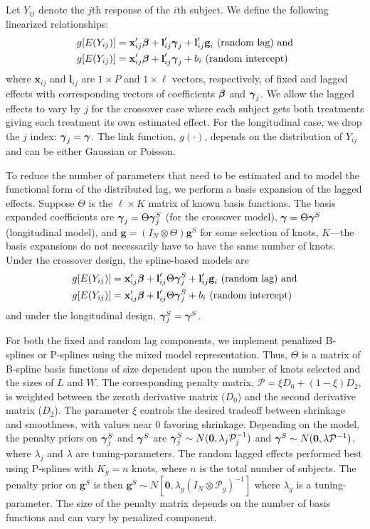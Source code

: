 \documentclass[10pt]{article}
\newcommand{\bbeta}{{\mbox{\boldmath$\beta$}}}
\newcommand{\bgamma}{{\mbox{\boldmath$\gamma$}}}
\newcommand{\bx}{\textbf{x}}
\newcommand{\bl}{\textbf{l}}
\newcommand{\bg}{\textbf{g}}
\begin{document}
Let $Y_{ij}$ denote the $j$th response of the $i$th subject. We define the following linearized relationships:
	\begin{align*}
		g[E(Y_{ij})] &= \bx_{ij}'\bbeta + \bl_{ij}'\bgamma_j +  \bl_{ij}'\bg_i \text{ (random lag) and}\\
		g[E(Y_{ij})] &= \bx_{ij}'\bbeta + \bl_{ij}'\bgamma_j + b_i\text{ (random intercept)}
	\end{align*}
	where $\bx_{ij}$ and $\bl_{ij}$ are $1\times P$ and $1\times\ell$ vectors, respectively, of fixed and lagged effects with corresponding vectors of coefficients $\bbeta$ and $\bgamma_j$. We allow the lagged effects to vary by $j$ for the crossover case where each subject gets both treatments giving each treatment its own estimated effect. For the longitudinal case, we drop the $j$ index: $\bgamma_j = \bgamma$. The link function, $g(\cdot)$, depends on the distribution of $Y_{ij}$ and can be either Gaussian or Poisson. 
	
	To reduce the number of parameters that need to be estimated and to model the functional form of the distributed lag, we perform a basis expansion of the lagged effects. Suppose $\Theta$ is the $\ell\times K$ matrix of known basis functions. The basis expanded coefficients are $\bgamma_j = \Theta\bgamma_j^S$ (for the crossover model), $\bgamma = \Theta\bgamma^S$ (longitudinal model), and $\bg = (I_N\otimes \Theta)\bg^S$ for some selection of knots, $K$---the basis expansions do not necessarily have to have the same number of knots. Under the crossover design, the spline-based models are
	\begin{align*}
		g[E(Y_{ij})] &= \bx_{ij}'\bbeta + \bl_{ij}'\Theta\bgamma_j^S +  \bl_{ij}'\bg_i \text{ (random lag) and}\\
		g[E(Y_{ij})] &= \bx_{ij}'\bbeta + \bl_{ij}'\Theta\bgamma_j^S + b_i\text{ (random intercept)}
	\end{align*}
	and under the longitudinal design, $\bgamma_j^S = \bgamma^S$.
	
		For both the fixed and random lag components, we implement penalized B-splines or P-splines using the mixed model representation. Thus, $\Theta$ is a matrix of B-spline basis functions of size dependent upon the number of knots selected and the sizes of $L$ and $W$. The corresponding penalty matrix, $\mathcal{P} = \xi D_0 + (1-\xi)D_2$, is weighted between the zeroth derivative matrix ($D_0$) and the second derivative matrix ($D_2$). The parameter $\xi$ controls the desired tradeoff between shrinkage and smoothness, with values near 0 favoring shrinkage. Depending on the model, the penalty priors on $\bgamma_j^S$ and $\bgamma^S$ are $\bgamma_j^S \sim N(\textbf{0}, \lambda_{j} \mathcal{P}_j^{-1})$ and $\bgamma^S \sim N(\textbf{0}, \lambda \mathcal{P}^{-1})$, where $\lambda_{j}$ and $\lambda$ are tuning-parameters. The random lagged effects performed best using P-splines with $K_g = n$ knots, where $n$ is the total number of subjects. The penalty prior on $\bg^S$ is then $\bg^S \sim N\left[\textbf{0}, \lambda_{g}(I_N \otimes \mathcal{P}_g)^{-1}\right]$ where $\lambda_{g}$ is a tuning-parameter. The size of the penalty matrix depends on the number of basis functions and can vary by penalized component.
\end{document}
